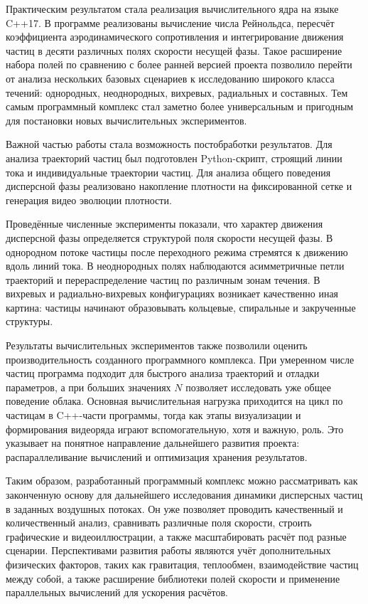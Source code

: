 \documentclass[14pt,a4paper]{extarticle}
\numberwithin{figure}{section}
\numberwithin{table}{section}
\begin{document}
Практическим результатом стала реализация вычислительного ядра на языке C++17.
В программе реализованы вычисление числа Рейнольдса, пересчёт коэффициента
аэродинамического сопротивления и интегрирование движения частиц в десяти различных
полях скорости несущей фазы. Такое расширение набора полей по сравнению с более ранней
версией проекта позволило перейти от анализа нескольких базовых сценариев к исследованию
широкого класса течений: однородных, неоднородных, вихревых, радиальных и составных.
Тем самым программный комплекс стал заметно более универсальным и пригодным для
постановки новых вычислительных экспериментов.

Важной частью работы стала возможность постобработки результатов. Для анализа траекторий частиц
был подготовлен Python-скрипт, строящий линии тока и индивидуальные траектории
частиц. Для анализа общего поведения дисперсной фазы реализовано накопление
плотности на фиксированной сетке и генерация видео эволюции плотности.

Проведённые численные эксперименты показали, что характер движения дисперсной фазы
определяется структурой поля скорости несущей фазы. В однородном потоке частицы
после переходного режима стремятся к движению вдоль линий тока. В неоднородных полях
наблюдаются асимметричные петли траекторий и перераспределение частиц по различным зонам
течения. В вихревых и радиально-вихревых конфигурациях возникает качественно иная картина:
частицы начинают образовывать кольцевые, спиральные и закрученные структуры.

Результаты вычислительных экспериментов также позволили оценить производительность созданного
программного комплекса. При умеренном числе частиц программа подходит для быстрого анализа
траекторий и отладки параметров, а при больших значениях $N$ позволяет исследовать уже
общее поведение облака. Основная вычислительная нагрузка приходится на цикл по
частицам в C++-части программы, тогда как этапы визуализации и формирования видеоряда играют
вспомогательную, хотя и важную, роль. Это указывает на понятное направление дальнейшего развития
проекта: распараллеливание вычислений и оптимизация хранения результатов.

Таким образом, разработанный программный комплекс можно рассматривать как законченную основу
для дальнейшего исследования динамики дисперсных частиц в заданных воздушных потоках. Он уже
позволяет проводить качественный и количественный анализ, сравнивать различные поля скорости,
строить графические и видеоиллюстрации, а также масштабировать расчёт под разные сценарии.
Перспективами развития работы являются учёт дополнительных физических факторов, таких как
гравитация, теплообмен, взаимодействие частиц между собой, а также расширение библиотеки полей
скорости и применение параллельных вычислений для ускорения расчётов.
\end{document}
